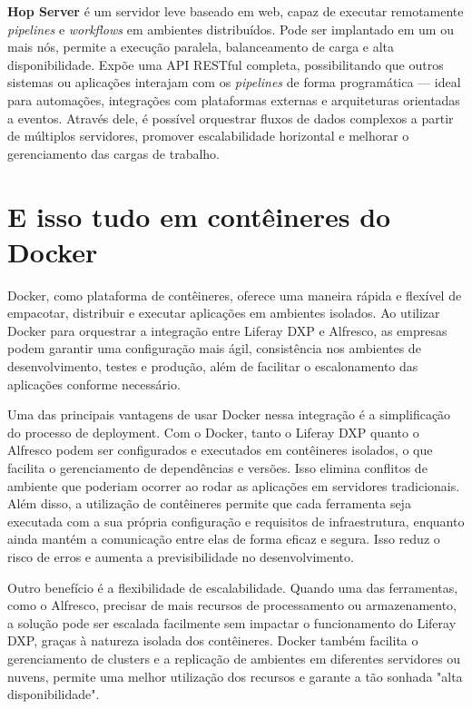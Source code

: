 \documentclass[a4paper,11pt]{article}
\begin{document}
\textbf{Hop Server} é um servidor leve baseado em web, capaz de executar remotamente \textit{pipelines} e \textit{workflows} em ambientes distribuídos. Pode ser implantado em um ou mais nós, permite a execução paralela, balanceamento de carga e alta disponibilidade. Expõe uma API RESTful completa, possibilitando que outros sistemas ou aplicações interajam com os \textit{pipelines} de forma programática — ideal para automações, integrações com plataformas externas e arquiteturas orientadas a eventos. Através dele, é possível orquestrar fluxos de dados complexos a partir de múltiplos servidores, promover escalabilidade horizontal e melhorar o gerenciamento das cargas de trabalho.


\section{E isso tudo em contêineres do Docker}
Docker, como plataforma de contêineres, oferece uma maneira rápida e flexível de empacotar, distribuir e executar aplicações em ambientes isolados. Ao utilizar Docker para orquestrar a integração entre Liferay DXP e Alfresco, as empresas podem garantir uma configuração mais ágil, consistência nos ambientes de desenvolvimento, testes e produção, além de facilitar o escalonamento das aplicações conforme necessário.

Uma das principais vantagens de usar Docker nessa integração é a simplificação do processo de deployment. Com o Docker, tanto o Liferay DXP quanto o Alfresco podem ser configurados e executados em contêineres isolados, o que facilita o gerenciamento de dependências e versões. Isso elimina conflitos de ambiente que poderiam ocorrer ao rodar as aplicações em servidores tradicionais. Além disso, a utilização de contêineres permite que cada ferramenta seja executada com a sua própria configuração e requisitos de infraestrutura, enquanto ainda mantém a comunicação entre elas de forma eficaz e segura. Isso reduz o risco de erros e aumenta a previsibilidade no desenvolvimento.

Outro benefício é a flexibilidade de escalabilidade. Quando uma das ferramentas, como o Alfresco, precisar de mais recursos de processamento ou armazenamento, a solução pode ser escalada facilmente sem impactar o funcionamento do Liferay DXP, graças à natureza isolada dos contêineres. Docker também facilita o gerenciamento de clusters e a replicação de ambientes em diferentes servidores ou nuvens, permite uma melhor utilização dos recursos e garante a tão sonhada "alta disponibilidade".
\end{document}

